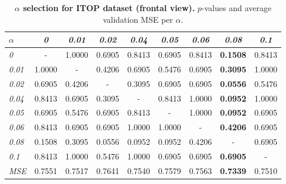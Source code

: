 \documentclass[review,12pt,3p]{elsarticle}
\begin{document}
\begin{table}[t]
\caption{\textbf{$\alpha$ selection for ITOP dataset (frontal view).} $p$-values and average validation MSE per $\alpha$.}
\label{tab:statsAL1iTOPfview}
\scriptsize %
\begin{center}
\setlength{\tabcolsep}{0.2em} %
\begin{tabular}{|l|c c c c c c c c |}
\hline
 $\alpha$ &\emph{0}& \emph{0.01} & \emph{0.02}& \emph{0.04}& \emph{0.05}& \emph{0.06}& \emph{0.08}& \emph{0.1} \\
  \hline \emph{0} & - & 1.0000 & 0.6905 & 0.8413 & 0.6905 & 0.8413 & \textbf{0.1508} & 0.8413  \\
  \hline \emph{0.01} & 1.0000 & - & 0.4206 & 0.6905 & 0.5476 & 0.6905 & \textbf{0.3095} & 1.0000  \\
  \hline \emph{0.02} & 0.6905 & 0.4206 & - & 0.3095 & 0.6905 & 0.6905 & \textbf{0.0556} & 0.5476  \\
  \hline \emph{0.04} & 0.8413 & 0.6905 & 0.3095 & - & 0.8413 & 1.0000 & \textbf{0.0952} & 1.0000  \\
  \hline \emph{0.05} & 0.6905 & 0.5476 & 0.6905 & 0.8413 & - & 1.0000 & \textbf{0.0952} & 0.6905  \\
  \hline \emph{0.06} & 0.8413 & 0.6905 & 0.6905 & 1.0000 & 1.0000 & - & \textbf{0.4206} & 0.6905  \\
  \hline \emph{0.08} & 0.1508 & 0.3095 & 0.0556 & 0.0952 & 0.0952 & 0.4206 & - & 0.6905  \\
  \hline \emph{0.1} & 0.8413 & 1.0000 & 0.5476 & 1.0000 & 0.6905 & 0.6905 & \textbf{0.6905} & -  \\
\hline 
\hline
\textit{MSE} & 0.7551 &   0.7517&    0.7641   & 0.7540 &   0.7579&    0.7563    &\textbf{0.7339} &   0.7510\\
\hline
\end{tabular} 
\end{center}
\end{table}
\end{document}

